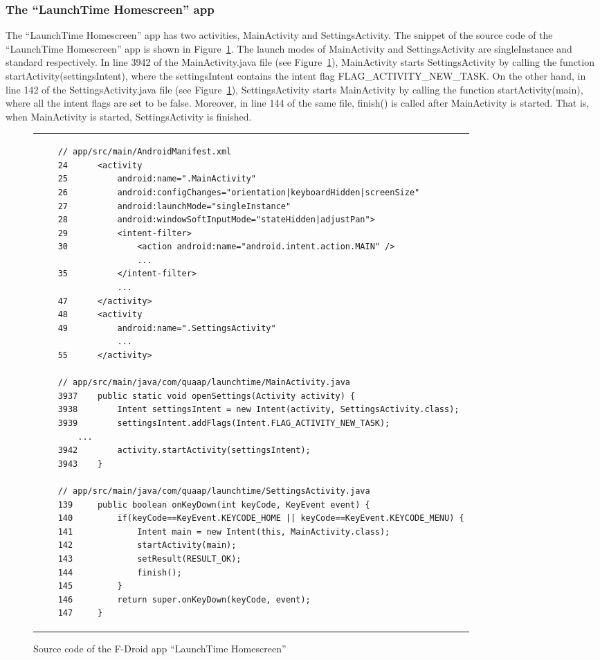 \subsubsection{The ``LaunchTime Homescreen'' app}
The ``LaunchTime Homescreen'' app has two activities, MainActivity and SettingsActivity. The snippet of the source code of the ``LaunchTime Homescreen'' app is shown in Figure~\ref{code-launchtime}. The launch modes of MainActivity and SettingsActivity are singleInstance and standard respectively. 
In line 3942 of the MainActivity.java file (see Figure~\ref{code-launchtime}), MainActivity starts SettingsActivity by calling the function startActivity(settingsIntent), where the settingsIntent contains the intent flag FLAG\_ACTIVITY\_NEW\_TASK. 
On the other hand, in line 142 of the SettingsActivity.java file (see Figure~\ref{code-launchtime}), SettingsActivity starts MainActivity by calling the function startActivity(main), where all the intent flags are set to be false. Moreover, in line 144 of the same file, finish() is called after MainActivity is started. That is, when MainActivity is started, SettingsActivity is finished. 

\begin{figure}[htbp]
    \centering
    \begin{tabular*}{\linewidth}{l}
    \begin{lstlisting}
    // app/src/main/AndroidManifest.xml
    24      <activity
    25          android:name=".MainActivity"
    26          android:configChanges="orientation|keyboardHidden|screenSize"
    27          android:launchMode="singleInstance"
    28          android:windowSoftInputMode="stateHidden|adjustPan">
    29          <intent-filter>
    30              <action android:name="android.intent.action.MAIN" />
                    ...
    35          </intent-filter>
                ...
    47      </activity>
    48      <activity
    49          android:name=".SettingsActivity"
                ...
    55      </activity>

    // app/src/main/java/com/quaap/launchtime/MainActivity.java
    3937    public static void openSettings(Activity activity) {
    3938        Intent settingsIntent = new Intent(activity, SettingsActivity.class);
    3939        settingsIntent.addFlags(Intent.FLAG_ACTIVITY_NEW_TASK);
		...
    3942        activity.startActivity(settingsIntent);
    3943    }

    // app/src/main/java/com/quaap/launchtime/SettingsActivity.java
    139     public boolean onKeyDown(int keyCode, KeyEvent event) {
    140         if(keyCode==KeyEvent.KEYCODE_HOME || keyCode==KeyEvent.KEYCODE_MENU) {
    141             Intent main = new Intent(this, MainActivity.class);
    142             startActivity(main);
    143             setResult(RESULT_OK);
    144             finish();
    145         }
    146         return super.onKeyDown(keyCode, event);
    147     }
    \end{lstlisting}
    \end{tabular*}
    \caption{Source code of the F-Droid app ``LaunchTime Homescreen''}
    \label{code-launchtime}
    \end{figure}

